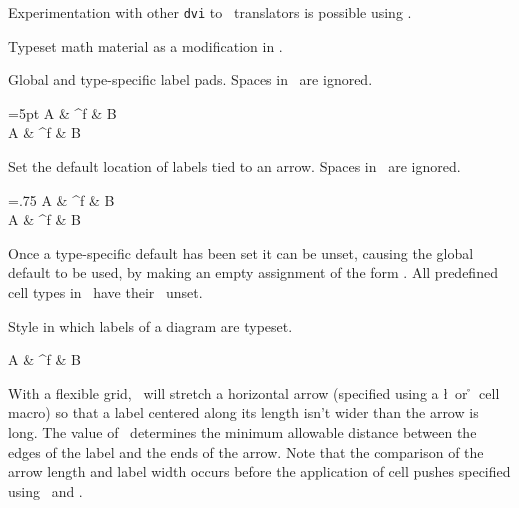 Experimentation with other {\tt dvi} to \PS\ translators is possible using
\csq\kuviospecial.
\endentry

Typeset math material as a modification in \csq{}.
\endentry

Global and type-specific label pads. Spaces in \type\ are ignored.

\side
{}=5pt
\Diagram A & \rTo ^f & B \\ \endDiagram
\quad
\Diagram A & \rOne ^f & B \\ \endDiagram
\endside
\endentry

Set the default location of labels tied to an arrow. Spaces in \type\ are
ignored.

\side
{}=.75
\Diagram A & \rTo ^f & B \\ \endDiagram
\quad
\Diagram A & \rOne ^f & B \\ \endDiagram
\endside

Once a type-specific
default has been set it can be unset, causing the global default to be used,
by making an empty assignment of the form
.
All predefined cell types in \kuvio\ have their \csq{}\
unset.
\endentry

Style in which labels of a diagram are typeset.

\side
\let\labelstyle\textstyle
\Diagram
A & \rTo ^f & B \\
\endDiagram
\endside
\endentry

With a flexible grid, \kuvio\ will stretch a horizontal arrow
(specified using a \csq\l\type\ or \csq\r\type\ cell macro) so
that a label centered along its length isn't wider than the arrow
is long.  The value of \csq\labelwidthpad\ determines the minimum
allowable distance between the edges of the label and the ends of
the arrow. Note that the comparison of the arrow length and label
width occurs before the application of cell pushes specified using
\csq\dt\ and \csq\dh.

